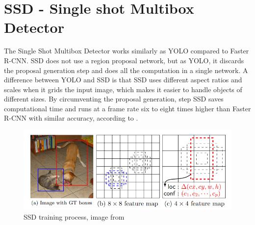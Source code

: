 

\newpage

\section{SSD - Single shot Multibox Detector}
The Single Shot Multibox Detector works similarly as YOLO compared to Faster R-CNN. SSD does not use a region proposal network, but as YOLO, it discards the proposal generation step and does all the computation in a single network. A difference between YOLO and SSD is that SSD uses different aspect ratios and scales when it grids the input image, which makes it easier to handle objects of different sizes. By circumventing the proposal generation, step SSD saves computational time and runs at a frame rate six to eight times higher than Faster R-CNN with similar accuracy, according to \citep{SSD}. 

\begin{figure}[h!]
    \centering
    \includegraphics[scale=0.5]{images/ssd_detection.png}
    \caption{SSD training process, image from \citep{SSD}}
    \label{fig:ssd_training}
\end{figure}

